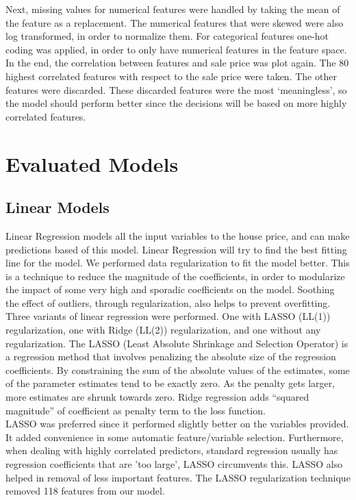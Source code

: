 \documentclass[a4paper,11pt]{article}
\begin{document}
Next, missing values for numerical features were handled by taking the mean of the feature as a replacement. The numerical features that were skewed were also log transformed, in order to normalize them. For categorical features one-hot coding was applied, in order to only have numerical features in the feature space. In the end, the correlation between features and sale price was plot again. The 80 highest correlated features with respect to the sale price were taken. The other features were discarded. These discarded features were the most ‘meaningless’, so the model should perform better since the decisions will be based on more highly correlated features. 


\clearpage
\section{Evaluated Models}
\subsection{Linear Models}
Linear Regression models all the input variables to the house price, and can make predictions based of this model. Linear Regression will try to find the best fitting line for the model. We performed data regularization to fit the model better. This is a technique to reduce the magnitude of the coefficients, in order to modularize the impact of some very high and sporadic coefficients on the model. Soothing the effect of outliers, through regularization, also helps to prevent overfitting.\\

Three variants of linear regression were performed. One with LASSO (LL(1)) \cite{fonti} regularization, one with Ridge (LL(2)) \cite{nie_huang_cai_ding} regularization, and one without any regularization. The LASSO (Least Absolute Shrinkage and Selection Operator) is a regression method that involves penalizing the absolute size of the regression coefficients. By constraining the sum of the absolute values of the estimates, some of the parameter estimates tend to be exactly zero. As the penalty gets larger, more estimates are shrunk towards zero. Ridge regression adds “squared magnitude” of coefficient as penalty term to the loss function.\\

LASSO was preferred since it performed slightly better on the variables provided. It added convenience in some automatic feature/variable selection. Furthermore, when dealing with highly correlated predictors, standard regression usually has regression coefficients that are 'too large', LASSO circumvents this. LASSO also helped in removal of less important features. The LASSO regularization technique removed 118 features from our model.
\end{document}
